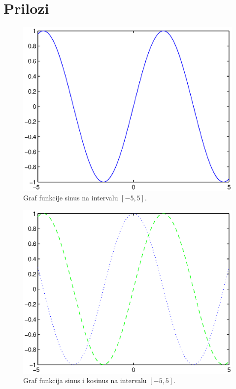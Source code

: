 \documentclass[a4paper, 10pt]{article}
\begin{document}
\section*{Prilozi}
\label{sec:prilozi}

\begin{figure}[!htb]
\centering
\includegraphics[width=0.95\linewidth]{slike/plot_sin_1.eps}
\caption{Graf funkcije sinus na intervalu $[-5, 5]$.}
\label{fig:plot_sin_1}
\end{figure}

\begin{figure}[!htb]
\centering
\includegraphics[width=0.95\linewidth]{slike/plot_sin_cos_1.eps}
\caption{Graf funkcija sinus i kosinus na intervalu $[-5, 5]$.}
\label{fig:plot_sin_cos_1}
\end{figure}
\end{document}
